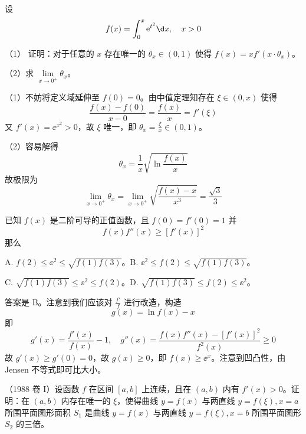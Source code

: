 \begin{problem}[000025]
设
\[ f(x) = \int_{0}^{x} \ee^{t^2} \d x, \quad x > 0 \]

（1） 证明：对于任意的 $x$ 存在唯一的 $\theta_x \in (0, 1)$ 使得 $f(x) = x f'(x \cdot \theta_x)$。

（2）求 $\lim\limits_{x \to 0^+} \theta_x$。
\end{problem}

\begin{solution}
	（1）不妨将定义域延伸至 $f(0) = 0$。由中值定理知存在 $\xi \in (0, x)$ 使得
	\[ \frac{f(x) - f(0)}{x - 0} = \frac{f(x)}{x} = f'(\xi) \]
	又 $f'(x) = \ee^{x^2} > 0$，故 $\xi$ 唯一，即 $\theta_x = \frac{\xi}{x} \in (0, 1)$。

	（2）容易解得
	\[ \theta_x = \frac{1}{x} \sqrt{\ln \frac{f(x)}{x}} \]
	故极限为
	\[ \lim_{x \to 0^+} \theta_x = \lim_{x \to 0^+} \sqrt{\frac{f(x) - x}{x^3}} = \frac{\sqrt{3}}{3} \]
\end{solution}

\begin{problem}[000026]
已知 $f(x)$ 是二阶可导的正值函数，且 $f(0) = f'(0) = 1$ 并
\[ f(x) f''(x) \geqslant [f'(x)]^2 \]
那么

A. $f(2) \leqslant \ee^2 \leqslant \sqrt{f(1)f(3)}$。B. $\ee^2 \leqslant f(2) \leqslant \sqrt{f(1)f(3)}$。

C. $\sqrt{f(1)f(3)} \leqslant \ee^2 \leqslant f(2)$。D. $\sqrt{f(1)f(3)} \leqslant f(2) \leqslant \ee^2$。
\end{problem}

\begin{solution}
	答案是 B。注意到我们应该对 $\frac{f'}{f}$ 进行改造，构造
	\[ g(x) = \ln f(x) - x \]
	即
	\[ g'(x) = \frac{f'(x)}{f(x)} - 1, \quad g''(x) = \frac{f(x) f''(x) - [f'(x)]^2}{f^2(x)} \geqslant 0 \]
	故 $g'(x) \geqslant g'(0) = 0$，故 $g(x) \geqslant 0$，即 $f(x) \geqslant \ee^x$。注意到凹凸性，由 Jensen 不等式即可比大小。
\end{solution}

\begin{problem}[000032]
（1988 卷 I）设函数 $f$ 在区间 $[a, b]$ 上连续，且在 $(a, b)$ 内有 $f'(x) > 0$。证明：在 $(a, b)$ 内存在唯一的 $\xi$，使得曲线 $y = f(x)$ 与两直线 $y = f(\xi), x = a$ 所围平面图形面积 $S_1$ 是曲线 $y = f(x)$ 与两直线 $y = f(\xi), x = b$ 所围平面图形 $S_2$ 的三倍。
\end{problem}

